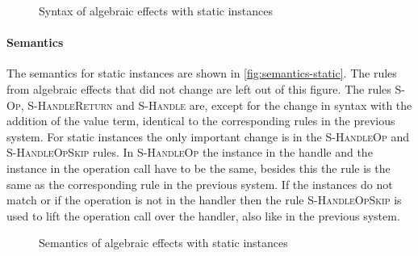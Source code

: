 {\begin{figure}
\caption{Syntax of algebraic effects with static instances}
\centering
{}
\end{figure}

\paragraph{Semantics}
The semantics for static instances are shown in \cref{fig:semantics-static}. The rules from algebraic effects that did not change are left out of this figure. The rules \textsc{S-Op}, \textsc{S-HandleReturn} and \textsc{S-Handle} are, except for the change in syntax with the addition of the value term, identical to the corresponding rules in the previous system. For static instances the only important change is in the \textsc{S-HandleOp} and \textsc{S-HandleOpSkip} rules. In \textsc{S-HandleOp} the instance in the handle and the instance in the operation call have to be the same, besides this the rule is the same as the corresponding rule in the previous system. If the instances do not match or if the operation is not in the handler then the rule \textsc{S-HandleOpSkip} is used to lift the operation call over the handler, also like in the previous system.

\begin{figure}
\caption{Semantics of algebraic effects with static instances}
\centering
{}
\end{figure}

}
